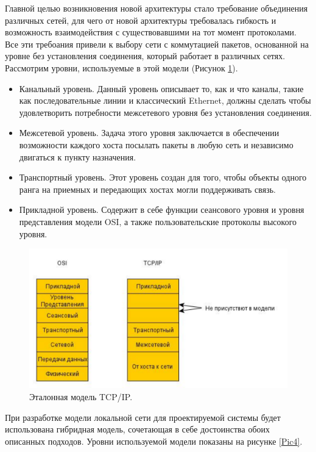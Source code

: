 \documentclass[12pt]{report}
\begin{document}
    Главной целью возникновения новой архитектуры стало требование объединения различных сетей, для чего от новой архитектуры требовалась гибкость и возможность взаимодействия с существовавшими на тот момент протоколами. Все эти требоания привели к выбору сети с коммутацией пакетов, основанной на уровне без установления соединения, который работает в различных сетях. Рассмотрим уровни, используемые в этой модели (Рисунок \ref{Pic3}).

    \begin{itemize}
        \item Канальный уровень. Данный уровень описывает то, как и что каналы, такие как последовательные линии и классический Ethernet, должны сделать чтобы удовлетворить потребности межсетевого уровня без установления соединения.
        \item Межсетевой уровень. Задача этого уровня заключается в обеспечении возможности каждого хоста посылать пакеты в любую сеть и независимо двигаться к пункту назначения.
        \item Транспортный уровень. Этот уровень создан для того, чтобы объекты одного ранга на приемных и передающих хостах могли поддерживать связь.
        \item Прикладной уровень. Содержит в себе функции сеансового уровня и уровня представления модели OSI, а также пользовательские протоколы высокого уровня.
    \end{itemize}

    \begin{figure}\center
        \includegraphics[width = 120mm]{Ch2Pic3}
        \caption{Эталонная модель TCP/IP.} \label{Pic3}
    \end{figure}

    При разработке модели локальной сети для проектируемой системы будет использована гибридная модель, сочетающая в себе достоинства обоих описанных подходов. Уровни используемой модели показаны на рисунке \ref{Pic4}.
\end{document}
